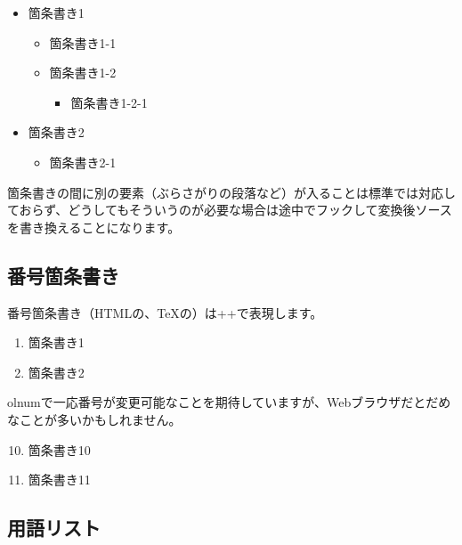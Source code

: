 \begin{itemize}
\item 箇条書き1

\begin{itemize}
\item 箇条書き1{-}1
\item 箇条書き1{-}2

\begin{itemize}
\item 箇条書き1{-}2{-}1
\end{itemize}

\end{itemize}

\item 箇条書き2

\begin{itemize}
\item 箇条書き2{-}1
\end{itemize}

\end{itemize}

箇条書きの間に別の要素（ぶらさがりの段落など）が入ることは標準では対応しておらず、どうしてもそういうのが必要な場合は途中でフックして変換後ソースを書き換えることになります。

\subsection{番号箇条書き}
\label{sec:1-3-2}

番号箇条書き（HTMLの、TeXの）は++で表現します。

\begin{enumerate}
\item 箇条書き1
\item 箇条書き2
\end{enumerate}

olnumで一応番号が変更可能なことを期待していますが、Webブラウザだとだめなことが多いかもしれません。

\begin{enumerate}
\setcounter{enumi}{9}
\item 箇条書き10
\item 箇条書き11
\end{enumerate}

\subsection{用語リスト}
\label{sec:1-3-3}


